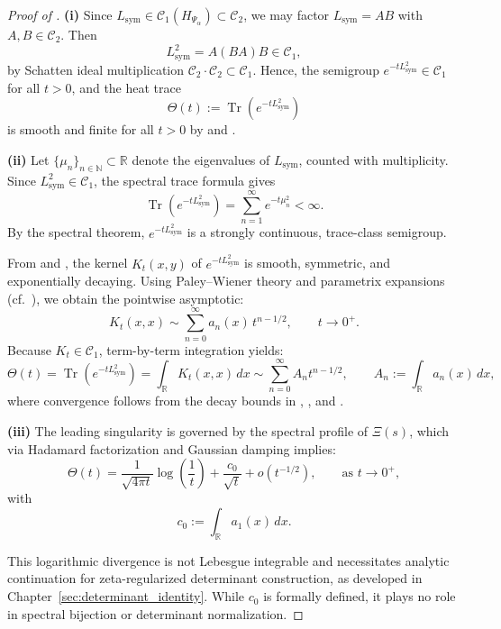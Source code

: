 \begin{proof}[Proof of ]
\textbf{(i)} Since \( L_{\mathrm{sym}} \in \mathcal{C}_1(H_{\Psi_\alpha}) \subset \mathcal{C}_2 \), we may factor \( L_{\mathrm{sym}} = AB \) with \( A, B \in \mathcal{C}_2 \). Then
\[
L_{\mathrm{sym}}^2 = A(BA)B \in \mathcal{C}_1,
\]
by Schatten ideal multiplication \( \mathcal{C}_2 \cdot \mathcal{C}_2 \subset \mathcal{C}_1 \). Hence, the semigroup \( e^{-tL_{\mathrm{sym}}^2} \in \mathcal{C}_1 \) for all \( t > 0 \), and the heat trace
\[
\Theta(t) := \operatorname{Tr}(e^{-tL_{\mathrm{sym}}^2})
\]
is smooth and finite for all \( t > 0 \) by  and .

\textbf{(ii)} Let \( \{ \mu_n \}_{n \in \mathbb{N}} \subset \mathbb{R} \) denote the eigenvalues of \( L_{\mathrm{sym}} \), counted with multiplicity. Since \( L_{\mathrm{sym}}^2 \in \mathcal{C}_1 \), the spectral trace formula gives
\[
\operatorname{Tr}(e^{-tL_{\mathrm{sym}}^2}) = \sum_{n=1}^{\infty} e^{-t \mu_n^2} < \infty.
\]
By the spectral theorem, \( e^{-tL_{\mathrm{sym}}^2} \) is a strongly continuous, trace-class semigroup.

From  and , the kernel \( K_t(x,y) \) of \( e^{-tL_{\mathrm{sym}}^2} \) is smooth, symmetric, and exponentially decaying. Using Paley–Wiener theory and parametrix expansions (cf.~\cite[Ch.~III]{Korevaar2004Tauberian}), we obtain the pointwise asymptotic:
\[
K_t(x,x) \sim \sum_{n=0}^{\infty} a_n(x)\, t^{n - 1/2}, \qquad t \to 0^+.
\]
Because \( K_t \in \mathcal{C}_1 \), term-by-term integration yields:
\[
\Theta(t) = \operatorname{Tr}(e^{-tL_{\mathrm{sym}}^2}) = \int_{\mathbb{R}} K_t(x,x) \, dx \sim \sum_{n=0}^{\infty} A_n t^{n - 1/2}, \qquad A_n := \int_{\mathbb{R}} a_n(x) \, dx,
\]
where convergence follows from the decay bounds in , , and .

\textbf{(iii)} The leading singularity is governed by the spectral profile of \( \Xi(s) \), which via Hadamard factorization and Gaussian damping implies:
\[
\Theta(t) = \frac{1}{\sqrt{4\pi t}} \log\left( \frac{1}{t} \right) + \frac{c_0}{\sqrt{t}} + o(t^{-1/2}), \qquad \text{as } t \to 0^+,
\]
with
\[
c_0 := \int_{\mathbb{R}} a_1(x)\, dx.
\]

This logarithmic divergence is not Lebesgue integrable and necessitates analytic continuation for zeta-regularized determinant construction, as developed in Chapter~\ref{sec:determinant_identity}. While \( c_0 \) is formally defined, it plays no role in spectral bijection or determinant normalization.
\end{proof}
